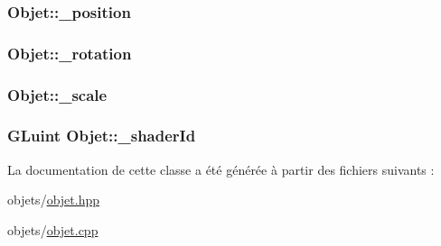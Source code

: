 \hypertarget{class_objet_a6c1a10fa5f4c5cd0e0617d93f42d927b}{
\subsubsection[{\+\_\+position}]{ Objet\+::\+\_\+position\hspace{0.3cm}{\ttfamily [protected]}}}\label{class_objet_a6c1a10fa5f4c5cd0e0617d93f42d927b}
\hypertarget{class_objet_a1d8675e88cc98ba740292af1421c2ee1}{
\subsubsection[{\+\_\+rotation}]{ Objet\+::\+\_\+rotation\hspace{0.3cm}{\ttfamily [protected]}}}\label{class_objet_a1d8675e88cc98ba740292af1421c2ee1}
\hypertarget{class_objet_a3fee0c5016edddf7c4b9a0b55ef44752}{
\subsubsection[{\+\_\+scale}]{ Objet\+::\+\_\+scale\hspace{0.3cm}{\ttfamily [protected]}}}\label{class_objet_a3fee0c5016edddf7c4b9a0b55ef44752}
\hypertarget{class_objet_af0d545a506dbfa377c8ca5a499fdf755}{
\subsubsection[{\+\_\+shader\+Id}]{\setlength{\rightskip}{0pt plus 5cm}G\+Luint Objet\+::\+\_\+shader\+Id\hspace{0.3cm}{\ttfamily [protected]}}}\label{class_objet_af0d545a506dbfa377c8ca5a499fdf755}


La documentation de cette classe a été générée à partir des fichiers suivants \+:\begin{DoxyCompactItemize}
\item 
objets/\hyperlink{objet_8hpp}{objet.\+hpp}\item 
objets/\hyperlink{objet_8cpp}{objet.\+cpp}\end{DoxyCompactItemize}

